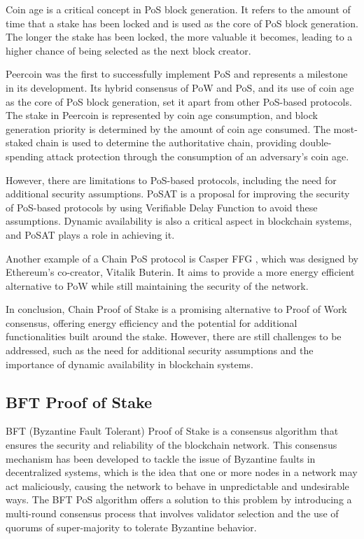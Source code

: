 Coin age is a critical concept in PoS block generation. It refers to the amount of time that a stake has been locked and is used as the core of PoS block generation. The longer the stake has been locked, the more valuable it becomes, leading to a higher chance of being selected as the next block creator.

Peercoin \cite{peercoin_foundation} was the first to successfully implement PoS and represents a milestone in its development. Its hybrid consensus of PoW and PoS, and its use of coin age as the core of PoS block generation, set it apart from other PoS-based protocols. The stake in Peercoin is represented by coin age consumption, and block generation priority is determined by the amount of coin age consumed. The most-staked chain is used to determine the authoritative chain, providing double-spending attack protection through the consumption of an adversary's coin age.

However, there are limitations to PoS-based protocols, including the need for additional security assumptions. PoSAT is a proposal for improving the security of PoS-based protocols by using Verifiable Delay Function to avoid these assumptions. Dynamic availability is also a critical aspect in blockchain systems, and PoSAT plays a role in achieving it.

Another example of a Chain PoS protocol is Casper FFG \cite{buterin2017casper}, which was designed by Ether\-eum's co-creator, Vitalik Buterin. It aims to provide a more energy efficient alternative to PoW while still maintaining the security of the network.

In conclusion, Chain Proof of Stake is a promising alternative to Proof of Work consensus, offering energy efficiency and the potential for additional functionalities built around the stake. However, there are still challenges to be addressed, such as the need for additional security assumptions and the importance of dynamic availability in blockchain systems.


\subsection*{\textbf{BFT Proof of Stake}}

BFT (Byzantine Fault Tolerant) Proof of Stake is a consensus algorithm that ensures the security and reliability of the blockchain network. This consensus mechanism has been developed to tackle the issue of Byzantine faults in decentralized systems, which is the idea that one or more nodes in a network may act maliciously, causing the network to behave in unpredictable and undesirable ways. The BFT PoS algorithm offers a solution to this problem by introducing a multi-round consensus process that involves validator selection and the use of quorums of super-majority to tolerate Byzantine behavior.

